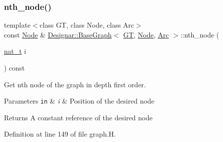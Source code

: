 \subsubsection{\texorpdfstring{nth\+\_\+node()}{nth\_node()}\hspace{0.1cm}{\footnotesize\ttfamily [2/2]}}
{\footnotesize\ttfamily template$<$class GT, class Node, class Arc$>$ \\
const \hyperlink{namespace_designar_a5af326c65aa2bd26b26c410f2030d09e}{Node} \& \hyperlink{class_designar_1_1_base_graph}{Designar\+::\+Base\+Graph}$<$ \hyperlink{demo-buildgraph_8_c_a3001c40d2c31ca87ed96cd7d1334a55e}{GT}, \hyperlink{namespace_designar_a5af326c65aa2bd26b26c410f2030d09e}{Node}, \hyperlink{namespace_designar_a3f55fb5513d62ff47cbc8f72b8e95d6f}{Arc} $>$\+::nth\+\_\+node (\begin{DoxyParamCaption}\item[{\hyperlink{namespace_designar_aa72662848b9f4815e7bf31a7cf3e33d1}{nat\+\_\+t}}]{i }\end{DoxyParamCaption}) const\hspace{0.3cm}{\ttfamily [inline]}}



Get nth node of the graph in depth first order. 


\begin{DoxyParams}[1]{Parameters}
\mbox{\tt in}  & {\em i} & Position of the desired node \\
\hline
\end{DoxyParams}
\begin{DoxyReturn}{Returns}
A constant reference of the desired node 
\end{DoxyReturn}


Definition at line 149 of file graph.\+H.

\mbox{\label{class_designar_1_1_base_graph_af1653bc8e50c53d27997951798a8a716}} 
